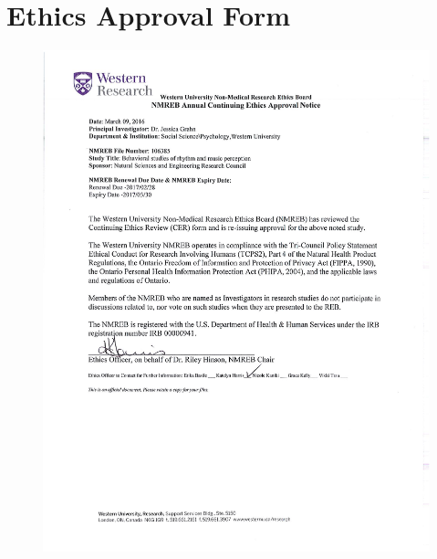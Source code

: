 \chapter{Ethics Approval Form}\label{appendix:ethics}

%

\begin{figure}[h]
%
%
   {\includegraphics[width=1.2\textwidth]{Figures/EthicsApproval.pdf}}
\end{figure}